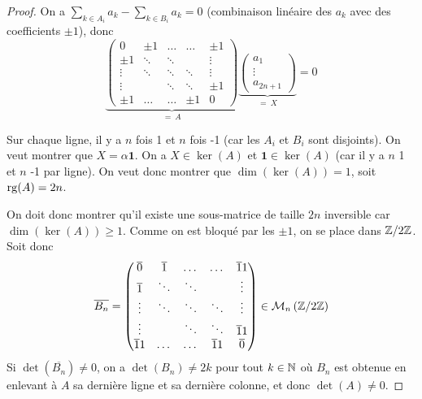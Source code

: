 \begin{proof}
    On a $\sum_{k\in A_{i}}a_{k}-\sum_{k\in B_{i}}a_{k}=0$ (combinaison linéaire des $a_{k}$ avec des coefficients $\pm1$), donc 
    \begin{equation}
        \underbrace{
            \begin{pmatrix}
                0 & \pm 1&\dots&\dots&\pm1\\
                \pm 1&\ddots&\ddots&&\vdots\\
                \vdots&\ddots&\ddots&\ddots&\vdots\\
                \vdots&&\ddots&\ddots&\pm1\\
                \pm1&\dots&\dots&\pm1&0
            \end{pmatrix}
        }_{=~A}
        \underbrace{
            \begin{pmatrix}
                a_{1}\\
                \vdots\\
                a_{2n+1}
            \end{pmatrix}
        }_{=~X}=0
    \end{equation}

    Sur chaque ligne, il y a $n$ fois 1 et $n$ fois -1 (car les $A_{i}$ et $B_{i}$ sont disjoints). On veut montrer que $X=\alpha\bm{1}$. On a $X\in\ker(A)$ et $\bm{1}\in\ker(A)$ (car il y a $n$ 1 et $n$ -1 par ligne). On veut donc montrer que $\dim(\ker(A))=1$, soit $\operatorname{rg}(A)=2n$.

    On doit donc montrer qu'il existe une sous-matrice de taille $2n$ inversible car $\dim(\ker(A))\geqslant1$. Comme on est bloqué par les $\pm1$, on se place dans $\mathbb{Z}/2\mathbb{Z}$. Soit donc 
    \begin{equation}
        \overline{B_{n}}=
        \begin{pmatrix}
            \overline{0} & \overline{1}&\dots&\dots&\overline{1}1\\
            \overline{1}&\ddots&\ddots&&\vdots\\
            \vdots&\ddots&\ddots&\ddots&\vdots\\
            \vdots&&\ddots&\ddots&\overline{1}1\\
            \overline{1}1&\dots&\dots&\overline{1}1&\overline{0}
        \end{pmatrix}\in\mathcal{M}_{n}\left(\mathbb{Z}/2\mathbb{Z}\right)
    \end{equation}
    Si $\det(\overline{B_{n}})\neq0$, on a $\det(B_{n})\neq 2k$ pour tout $k\in\mathbb{N}$ où $B_{n}$ est obtenue en enlevant à $A$ sa dernière ligne et sa dernière colonne, et donc $\det(A)\neq0$.


\end{proof}
